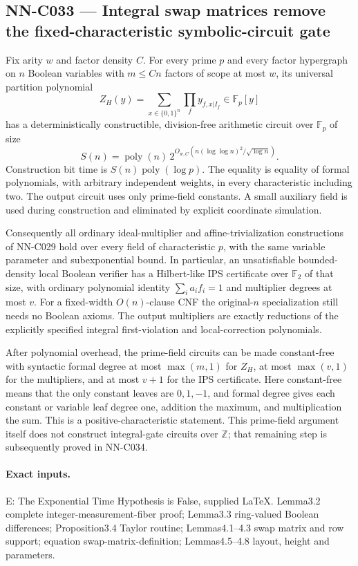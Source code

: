 \subsection{NN-C033 --- Integral swap matrices remove the fixed-characteristic symbolic-circuit gate}
\begin{proposition}[NN-C033]
Fix arity $w$ and factor density $C$. For every prime $p$ and every factor hypergraph on $n$ Boolean variables with $m\leq Cn$ factors of scope at most $w$, its universal partition polynomial
\[
 Z_H(y)=\sum_{x\in\{0,1\}^n}\prod_f y_{f,x|I_f}
                      \in\mathbb F_p[y]
\]
has a deterministically constructible, division-free arithmetic circuit over $\mathbb F_p$ of size
\[
 S(n)=\operatorname{poly}(n)\,
       2^{O_{w,C}(n(\log\log n)^2/\sqrt{\log n})}.
\]
Construction bit time is $S(n)\operatorname{poly}(\log p)$. The equality is equality of formal polynomials, with arbitrary independent weights, in every characteristic including two. The output circuit uses only prime-field constants. A small auxiliary field is used during construction and eliminated by explicit coordinate simulation.

Consequently all ordinary ideal-multiplier and affine-trivialization constructions of NN-C029 hold over every field of characteristic $p$, with the same variable parameter and subexponential bound. In particular, an unsatisfiable bounded-density local Boolean verifier has a Hilbert-like IPS certificate over $\mathbb F_2$ of that size, with ordinary polynomial identity $\sum_i a_i f_i=1$ and multiplier degrees at most $v$. For a fixed-width $O(n)$-clause CNF the original-$n$ specialization still needs no Boolean axioms. The output multipliers are exactly reductions of the explicitly specified integral first-violation and local-correction polynomials.

After polynomial overhead, the prime-field circuits can be made constant-free with syntactic formal degree at most $\max(m,1)$ for $Z_H$, at most $\max(v,1)$ for the multipliers, and at most $v+1$ for the IPS certificate. Here constant-free means that the only constant leaves are $0,1,-1$, and formal degree gives each constant or variable leaf degree one, addition the maximum, and multiplication the sum. This is a positive-characteristic statement. This prime-field argument itself does not construct integral-gate circuits over $\mathbb Z$; that remaining step is subsequently proved in NN-C034.
\end{proposition}
\paragraph{Exact inputs.}
E: The Exponential Time Hypothesis is False, supplied LaTeX. Lemma3.2 complete integer-measurement-fiber proof; Lemma3.3 ring-valued Boolean differences; Proposition3.4 Taylor routine; Lemmas4.1--4.3 swap matrix and row support; equation swap-matrix-definition; Lemmas4.5--4.8 layout, height and parameters.

